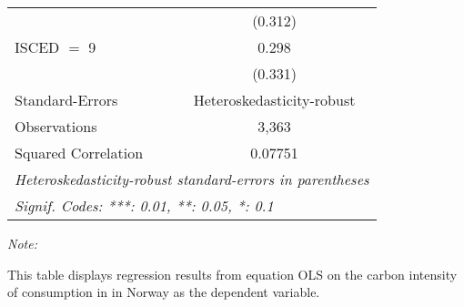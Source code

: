 \begin{table}[htbp!]
\begin{adjustbox}{width = 1\textwidth, max height = 0.95\textheight, center}
\begin{threeparttable}[b]
\begin{tabular}{lc}
                                & (0.312)\\   
            ISCED $=$ 9         & 0.298\\   
                                & (0.331)\\   
            \midrule 
            Standard-Errors     & Heteroskedasticity-robust \\   
            Observations        & 3,363\\  
            Squared Correlation & 0.07751\\  
            \midrule \midrule
            \multicolumn{2}{l}{\emph{Heteroskedasticity-robust standard-errors in parentheses}}\\
            \multicolumn{2}{l}{\emph{Signif. Codes: ***: 0.01, **: 0.05, *: 0.1}}\\
         \end{tabular}
         
         \begin{tablenotes}\item \medskip \textit{Note:}
            \item This table displays regression results from equation OLS on the carbon intensity of consumption in  in Norway as the dependent variable. 
         \end{tablenotes}
      \end{threeparttable}
   \end{adjustbox}
\end{table}


